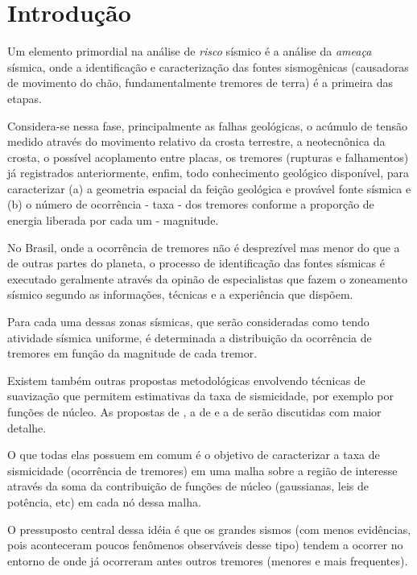 \chapter{Introdução}
\label{cap:introducao}

Um elemento primordial na análise
de \emph{risco} sísmico é a análise da \emph{ameaça} sísmica,
onde a identificação e caracterização das fontes sismogênicas (causadoras de
movimento do chão, fundamentalmente tremores de terra) é a primeira das etapas. 

Considera-se nessa fase, principalmente as falhas
geológicas, o acúmulo de tensão medido através do movimento relativo da crosta
terrestre, a neotecnônica da crosta, o possível acoplamento entre placas, os tremores
(rupturas e falhamentos) já registrados anteriormente, enfim, todo conhecimento geológico
disponível, para caracterizar (a) a geometria espacial da feição geológica e provável fonte
sísmica e (b) o número de ocorrência - taxa - dos tremores conforme a
proporção de energia liberada por cada um - magnitude.

No Brasil, onde a ocorrência de tremores não é desprezível mas menor do que a de
outras partes do planeta, o processo de identificação das fontes sísmicas é
executado geralmente através da opinão de especialistas que fazem o zoneamento
sísmico segundo as informações, técnicas e a experiência que dispõem.

Para cada uma dessas zonas sísmicas, que serão consideradas como tendo atividade
sísmica uniforme, é determinada a distribuição da ocorrência de tremores em função
da magnitude de cada tremor.

Existem também outras propostas metodológicas envolvendo técnicas de suavização
que permitem estimativas da taxa de sismicidade, por exemplo por funções de núcleo.
As propostas de \citet{frankel_1995}, a de \citet{woo_1996} e a de
\citet{helmstetter_2012} serão discutidas com maior detalhe.

O que todas elas possuem em comum é o objetivo de caracterizar a taxa de
sismicidade (ocorrência de tremores) em uma malha sobre a região de interesse
através da soma da contribuição de funções de núcleo (gaussianas, leis de
potência, etc) em cada nó dessa malha.

O pressuposto central dessa
idéia é que os grandes sismos (com menos evidências, pois
aconteceram poucos fenômenos observáveis desse tipo) 
tendem a ocorrer no entorno de
onde já ocorreram antes outros tremores (menores e mais frequentes).

